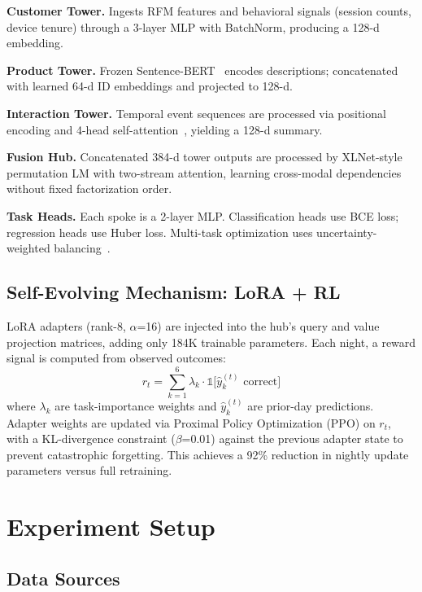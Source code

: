 \documentclass[10pt,twocolumn]{article}
\begin{document}
\textbf{Customer Tower.} Ingests RFM features and behavioral signals (session counts, device tenure) through a 3-layer MLP with BatchNorm, producing a 128-d embedding.

\textbf{Product Tower.} Frozen Sentence-BERT~\cite{reimers2019sbert} encodes descriptions; concatenated with learned 64-d ID embeddings and projected to 128-d.

\textbf{Interaction Tower.} Temporal event sequences are processed via positional encoding and 4-head self-attention~\cite{vaswani2017attention}, yielding a 128-d summary.

\textbf{Fusion Hub.} Concatenated 384-d tower outputs are processed by XLNet-style~\cite{yang2019xlnet} permutation LM with two-stream attention, learning cross-modal dependencies without fixed factorization order.

\textbf{Task Heads.} Each spoke is a 2-layer MLP. Classification heads use BCE loss; regression heads use Huber loss. Multi-task optimization uses uncertainty-weighted balancing~\cite{kendall2018multi}.

\subsection{Self-Evolving Mechanism: LoRA + RL}

LoRA adapters (rank-8, $\alpha$=16) are injected into the hub's query and value projection matrices, adding only 184K trainable parameters. Each night, a reward signal is computed from observed outcomes:
\begin{equation}
r_t = \sum_{k=1}^{6} \lambda_k \cdot \mathbb{1}\bigl[\hat{y}_k^{(t)} \text{ correct}\bigr]
\end{equation}
where $\lambda_k$ are task-importance weights and $\hat{y}_k^{(t)}$ are prior-day predictions. Adapter weights are updated via Proximal Policy Optimization (PPO) on $r_t$, with a KL-divergence constraint ($\beta$=0.01) against the previous adapter state to prevent catastrophic forgetting. This achieves a 92\% reduction in nightly update parameters versus full retraining.

\section{Experiment Setup}

\subsection{Data Sources}
\end{document}
